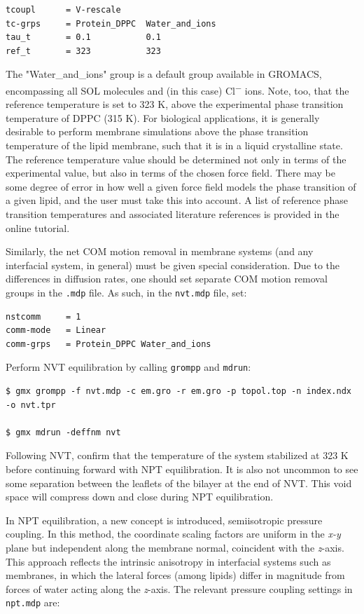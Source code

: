 \documentclass[9pt,tutorial,pubversion]{livecoms}
\begin{document}
\begin{lstlisting}
tcoupl      = V-rescale
tc-grps     = Protein_DPPC  Water_and_ions
tau_t       = 0.1           0.1
ref_t       = 323           323
\end{lstlisting}

The "Water\_and\_ions" group is a default group available in GROMACS, encompassing all SOL molecules and (in this case) Cl\textsuperscript{$-$} ions. Note, too, that the reference temperature is set to 323 K, above the experimental phase transition temperature of DPPC (315 K). For biological applications, it is generally desirable to perform membrane simulations above the phase transition temperature of the lipid membrane, such that it is in a liquid crystalline state. The reference temperature value should be determined not only in terms of the experimental value, but also in terms of the chosen force field. There may be some degree of error in how well a given force field models the phase transition of a given lipid, and the user must take this into account. A list of reference phase transition temperatures and associated literature references is provided in the online tutorial.

Similarly, the net COM motion removal in membrane systems (and any interfacial system, in general) must be given special consideration. Due to the differences in diffusion rates, one should set separate COM motion removal groups in the \texttt{.mdp} file. As such, in the \texttt{nvt.mdp} file, set:

\begin{lstlisting}
nstcomm     = 1
comm-mode   = Linear
comm-grps   = Protein_DPPC Water_and_ions
\end{lstlisting}

Perform NVT equilibration by calling \texttt{grompp} and \texttt{mdrun}:

\begin{lstlisting}
$ gmx grompp -f nvt.mdp -c em.gro -r em.gro -p topol.top -n index.ndx -o nvt.tpr

$ gmx mdrun -deffnm nvt
\end{lstlisting}

Following NVT, confirm that the temperature of the system stabilized at 323 K before continuing forward with NPT equilibration. It is also not uncommon to see some separation between the leaflets of the bilayer at the end of NVT. This void space will compress down and close during NPT equilibration.

In NPT equilibration, a new concept is introduced, semiisotropic pressure coupling. In this method, the coordinate scaling factors are uniform in the {\em x-y} plane but independent along the membrane normal, coincident with the {\em z}-axis. This approach reflects the intrinsic anisotropy in interfacial systems such as membranes, in which the lateral forces (among lipids) differ in magnitude from forces of water acting along the {\em z}-axis. The relevant pressure coupling settings in \texttt{npt.mdp} are:
\end{document}
